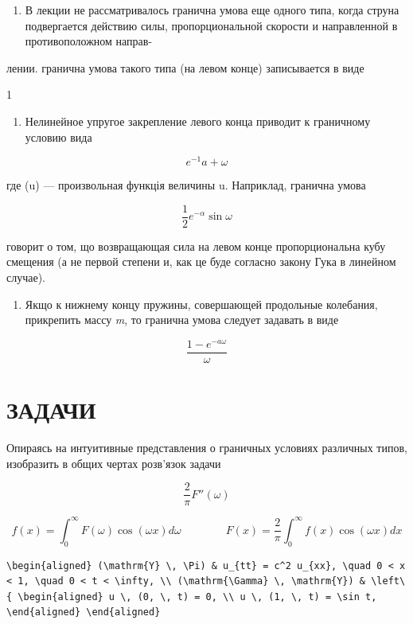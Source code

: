 \documentclass[
  ukrainian,
]{article}
\providecommand{\tightlist}{%
  \setlength{\itemsep}{0pt}\setlength{\parskip}{0pt}}
\begin{document}
\begin{enumerate}
\def\labelenumi{\arabic{enumi}.}
\tightlist
\item
  В лекции не рассматривалось гранична умова еще одного типа, когда
  струна подвергается действию силы, пропорциональной скорости и
  направленной в противоположном направ-
\end{enumerate}

лении. гранична умова такого типа (на левом конце) записывается в виде

1

\begin{enumerate}
\def\labelenumi{\arabic{enumi}.}
\setcounter{enumi}{1}
\tightlist
\item
  Нелинейное упругое закрепление левого конца приводит к граничному
  условию вида
\end{enumerate}

\[
e^{-1}a + \omega
\]

где \varphi(u) --- произвольная функція величины u. Наприклад, гранична
умова

\[
\frac{1}{2}e^{-\alpha}\sin\omega
\]

говорит о том, що возвращающая сила на левом конце пропорциональна кубу
смещения (а не первой степени и, как це буде согласно закону Гука в
линейном случае).

\begin{enumerate}
\def\labelenumi{\arabic{enumi}.}
\setcounter{enumi}{2}
\tightlist
\item
  Якщо к нижнему концу пружины, совершающей продольные колебания,
  прикрепить массу \emph{m}, то гранична умова следует задавать в виде
\end{enumerate}

\[
\frac{1-e^{-a\omega}}{\omega}
\]

\section{ЗАДАЧИ}\label{ux437ux430ux434ux430ux447ux438-3}

Опираясь на интуитивные представления о граничных условиях различных
типов, изобразить в общих чертах розв'язок задачи

\[
\frac{2}{\pi}F''(\omega)
\]

\[
f(x) = \int_{0}^{\infty} F(\omega) \cos(\omega x) d\omega \qquad \qquad F(x) = \frac{2}{\pi} \int_{0}^{\infty} f(x) \cos(\omega x) dx
\]

\begin{verbatim}
\begin{aligned} (\mathrm{Y} \, \Pi) & u_{tt} = c^2 u_{xx}, \quad 0 < x < 1, \quad 0 < t < \infty, \\ (\mathrm{\Gamma} \, \mathrm{Y}) & \left\{ \begin{aligned} u \, (0, \, t) = 0, \\ u \, (1, \, t) = \sin t, \end{aligned} \end{aligned}
\end{verbatim}
\end{document}
